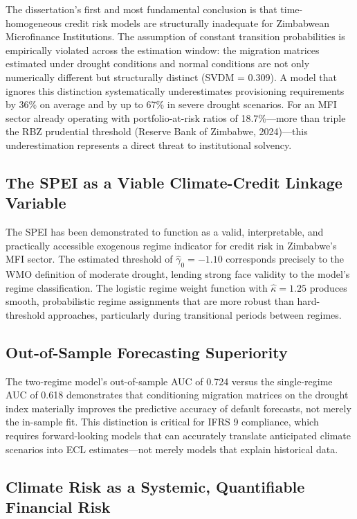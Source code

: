 \documentclass[12pt,a4paper]{article}
\begin{document}
The dissertation's first and most fundamental conclusion is that time-homogeneous credit risk models are structurally inadequate for Zimbabwean Microfinance Institutions. The assumption of constant transition probabilities is empirically violated across the estimation window: the migration matrices estimated under drought conditions and normal conditions are not only numerically different but structurally distinct (SVDM = 0.309). A model that ignores this distinction systematically underestimates provisioning requirements by 36\% on average and by up to 67\% in severe drought scenarios. For an MFI sector already operating with portfolio-at-risk ratios of 18.7\%---more than triple the RBZ prudential threshold (Reserve Bank of Zimbabwe, 2024)---this underestimation represents a direct threat to institutional solvency.

\subsection{The SPEI as a Viable Climate-Credit Linkage Variable}

The SPEI has been demonstrated to function as a valid, interpretable, and practically accessible exogenous regime indicator for credit risk in Zimbabwe's MFI sector. The estimated threshold of $\hat{\gamma}_0 = -1.10$ corresponds precisely to the WMO definition of moderate drought, lending strong face validity to the model's regime classification. The logistic regime weight function with $\hat{\kappa} = 1.25$ produces smooth, probabilistic regime assignments that are more robust than hard-threshold approaches, particularly during transitional periods between regimes.

\subsection{Out-of-Sample Forecasting Superiority}

The two-regime model's out-of-sample AUC of 0.724 versus the single-regime AUC of 0.618 demonstrates that conditioning migration matrices on the drought index materially improves the predictive accuracy of default forecasts, not merely the in-sample fit. This distinction is critical for IFRS 9 compliance, which requires forward-looking models that can accurately translate anticipated climate scenarios into ECL estimates---not merely models that explain historical data.

\subsection{Climate Risk as a Systemic, Quantifiable Financial Risk}
\end{document}
